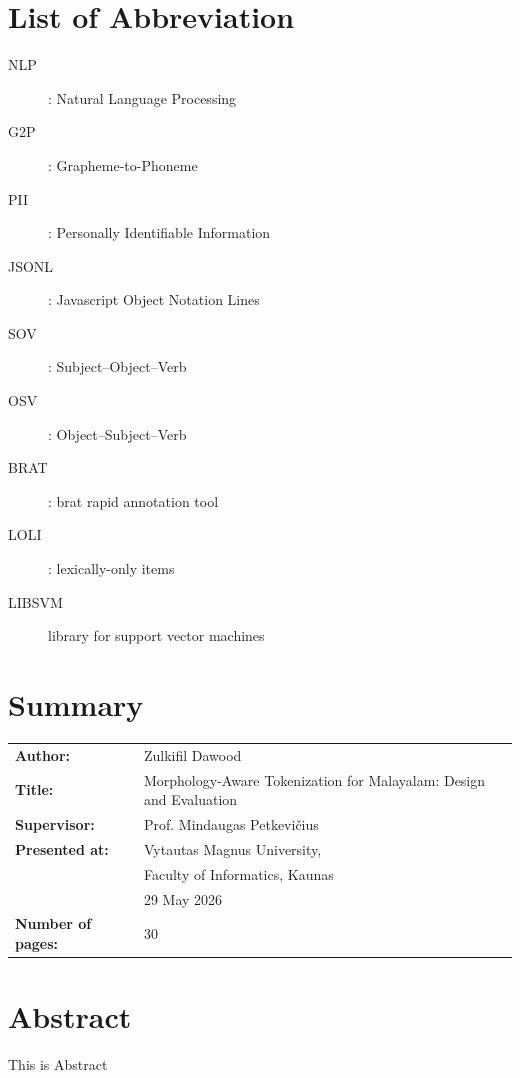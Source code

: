 \documentclass[12pt]{article}
\begin{document}
	\section*{List of Abbreviation}
	\begin{description}
		\item[NLP] : Natural Language Processing 
		\item[G2P]: Grapheme-to-Phoneme
		\item[PII]: Personally Identifiable Information
		\item[JSONL]: Javascript Object Notation Lines 
		\item[SOV]: Subject–Object–Verb
		\item[OSV]: Object–Subject–Verb 
		\item[BRAT]: brat rapid annotation tool 
		\item[LOLI]: lexically-only items
		\item[LIBSVM] library for support vector machines
	\end{description}
	\newpage
	
	
	\section*{Summary}
	\renewcommand\arraystretch{1.3} %
	\noindent
	\begin{tabular}{@{} >{\bfseries}p{4cm} p{\dimexpr\textwidth-4cm}@{}}
		Author:          & Zulkifil Dawood          \\ 
		Title:           &  Morphology-Aware Tokenization for Malayalam: Design and Evaluation\\ 
		Supervisor:      & Prof. Mindaugas Petkevičius           \\ 
		Presented at:    & Vytautas Magnus University,    \\
		& Faculty of Informatics, Kaunas \\ 
		& 29 May 2026                         \\ 
		Number of pages: & 30                             \\ 
	\end{tabular}
	\newpage
	
	\section*{Abstract}
	This is Abstract 
	
\end{document}
